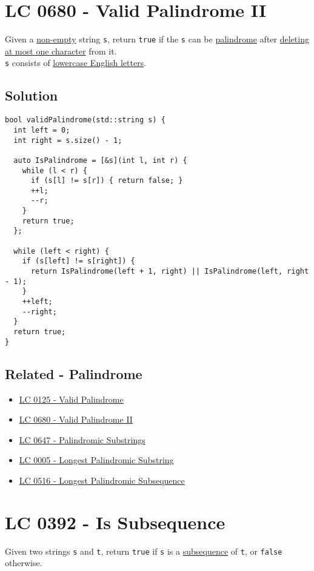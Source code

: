 \section{LC 0680 - Valid Palindrome II}\label{lc0680}
Given a \ul{non-empty} string {\colorbox{CodeBackground}{\lstinline|s|}}, return {\colorbox{CodeBackground}{\lstinline|true|}} if the {\colorbox{CodeBackground}{\lstinline|s|}} can be \ul{palindrome} after \ul{deleting at most one character} from it.\\

{\colorbox{CodeBackground}{\lstinline|s|}} consists of \ul{lowercase English letters}.

\subsection*{Solution}
\begin{lstlisting}
bool validPalindrome(std::string s) {
  int left = 0;
  int right = s.size() - 1;

  auto IsPalindrome = [&s](int l, int r) {
    while (l < r) {
      if (s[l] != s[r]) { return false; }
      ++l;
      --r;
    }
    return true;
  };

  while (left < right) {
    if (s[left] != s[right]) {
      return IsPalindrome(left + 1, right) || IsPalindrome(left, right - 1);
    }
    ++left;
    --right;
  }
  return true;
}
\end{lstlisting}

\subsection*{Related - Palindrome}
\begin{itemize}
	\item \hyperref[lc0125]{LC 0125 - Valid Palindrome}
 	\item \hyperref[lc0680]{LC 0680 - Valid Palindrome II}
	\item \hyperref[lc0647]{LC 0647 - Palindromic Substrings}
	\item \hyperref[lc0005]{LC 0005 - Longest Palindromic Substring}
	\item \hyperref[lc0516]{LC 0516 - Longest Palindromic Subsequence}
\end{itemize}

\section{LC 0392 - Is Subsequence}\label{lc0392}
Given two strings {\colorbox{CodeBackground}{\lstinline|s|}} and {\colorbox{CodeBackground}{\lstinline|t|}}, return {\colorbox{CodeBackground}{\lstinline|true|}} if {\colorbox{CodeBackground}{\lstinline|s|}} is a \ul{subsequence} of {\colorbox{CodeBackground}{\lstinline|t|}}, or {\colorbox{CodeBackground}{\lstinline|false|}} otherwise.\\

